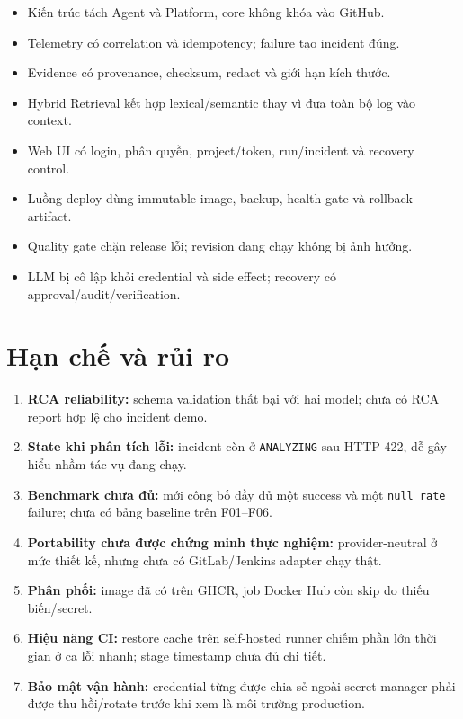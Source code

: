 \documentclass[12pt,a4paper,oneside]{report}
\newcommand{\code}[1]{\texttt{#1}}
\begin{document}
\begin{itemize}
  \item Kiến trúc tách Agent và Platform, core không khóa vào GitHub.
  \item Telemetry có correlation và idempotency; failure tạo incident đúng.
  \item Evidence có provenance, checksum, redact và giới hạn kích thước.
  \item Hybrid Retrieval kết hợp lexical/semantic thay vì đưa toàn bộ log vào context.
  \item Web UI có login, phân quyền, project/token, run/incident và recovery control.
  \item Luồng deploy dùng immutable image, backup, health gate và rollback artifact.
  \item Quality gate chặn release lỗi; revision đang chạy không bị ảnh hưởng.
  \item LLM bị cô lập khỏi credential và side effect; recovery có approval/audit/verification.
\end{itemize}

\section{Hạn chế và rủi ro}

\begin{enumerate}
  \item \textbf{RCA reliability:} schema validation thất bại với hai model; chưa có RCA report hợp
  lệ cho incident demo.
  \item \textbf{State khi phân tích lỗi:} incident còn ở \code{ANALYZING} sau HTTP 422, dễ gây
  hiểu nhầm tác vụ đang chạy.
  \item \textbf{Benchmark chưa đủ:} mới công bố đầy đủ một success và một \code{null\_rate}
  failure; chưa có bảng baseline trên F01--F06.
  \item \textbf{Portability chưa được chứng minh thực nghiệm:} provider-neutral ở mức thiết kế,
  nhưng chưa có GitLab/Jenkins adapter chạy thật.
  \item \textbf{Phân phối:} image đã có trên GHCR, job Docker Hub còn skip do thiếu biến/secret.
  \item \textbf{Hiệu năng CI:} restore cache trên self-hosted runner chiếm phần lớn thời gian ở ca
  lỗi nhanh; stage timestamp chưa đủ chi tiết.
  \item \textbf{Bảo mật vận hành:} credential từng được chia sẻ ngoài secret manager phải được
  thu hồi/rotate trước khi xem là môi trường production.
\end{enumerate}
\end{document}

